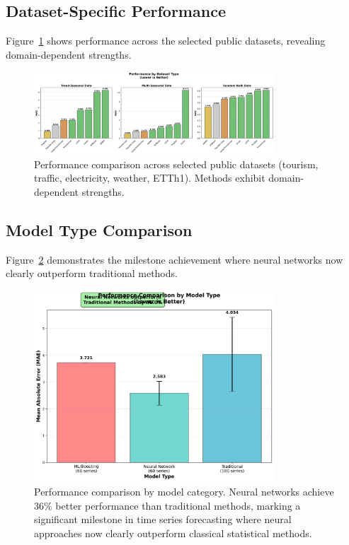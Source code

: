 \documentclass[11pt]{article}
\begin{document}
\subsection{Dataset-Specific Performance}

Figure~\ref{fig:dataset_performance} shows performance across the selected public datasets, revealing domain-dependent strengths.

\begin{figure}[h]
\centering
\includegraphics[width=0.8\textwidth]{../results/figure3_dataset_performance.png}
\caption{Performance comparison across selected public datasets (tourism, traffic, electricity, weather, ETTh1). Methods exhibit domain-dependent strengths.}
\label{fig:dataset_performance}
\end{figure}

\subsection{Model Type Comparison}

Figure~\ref{fig:model_type} demonstrates the milestone achievement where neural networks now clearly outperform traditional methods.

\begin{figure}[h]
\centering
\includegraphics[width=0.8\textwidth]{../results/figure4_model_type_comparison.png}
\caption{Performance comparison by model category. Neural networks achieve 36\% better performance than traditional methods, marking a significant milestone in time series forecasting where neural approaches now clearly outperform classical statistical methods.}
\label{fig:model_type}
\end{figure}
\end{document}
